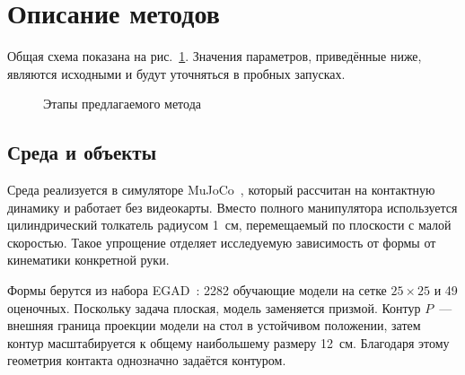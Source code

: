 \documentclass{misisarticle}
\begin{document}
\section{Описание методов}
\label{sec:methods}

Общая схема показана на рис.~\ref{fig:pipeline}. Значения параметров, приведённые ниже, являются исходными и будут уточняться в пробных запусках.

\begin{figure}[htbp]
  \centering
  \caption{Этапы предлагаемого метода}
  \label{fig:pipeline}
\end{figure}

\subsection{Среда и объекты}

Среда реализуется в симуляторе MuJoCo~\cite{mujoco2012}, который рассчитан на контактную динамику и работает без видеокарты. Вместо полного манипулятора используется цилиндрический толкатель радиусом 1~см, перемещаемый по плоскости с малой скоростью. Такое упрощение отделяет исследуемую зависимость от формы от кинематики конкретной руки.

Формы берутся из набора EGAD~\cite{morrison2020}: 2282 обучающие модели на сетке $25 \times 25$ и 49 оценочных. Поскольку задача плоская, модель заменяется призмой. Контур $P$~--- внешняя граница проекции модели на стол в устойчивом положении, затем контур масштабируется к общему наибольшему размеру 12~см. Благодаря этому геометрия контакта однозначно задаётся контуром.
\end{document}
